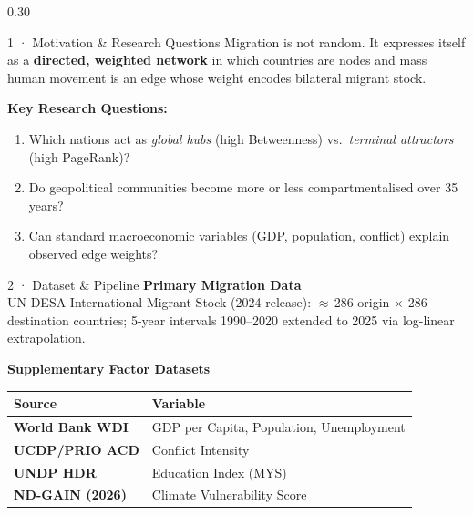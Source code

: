 \documentclass[final]{beamer}
\begin{document}
\begin{frame}[t,fragile]

\hspace{1.5cm}
\begin{columns}[T]

\begin{column}{0.30\textwidth}

  \begin{block}{1 · Motivation \& Research Questions}
    Migration is not random. It expresses itself as a
    \textbf{directed, weighted network} in which countries are nodes
    and mass human movement is an edge whose weight encodes
    bilateral migrant stock.

    \vspace{0.6em}
    \textbf{Key Research Questions:}
    \begin{enumerate}
      \item Which nations act as \emph{global hubs}
            (high Betweenness) vs.\ \emph{terminal attractors}
            (high PageRank)?
      \item Do geopolitical communities become more or
            less compartmentalised over 35 years?
      \item Can standard macroeconomic variables (GDP,
            population, conflict) explain observed edge weights?
    \end{enumerate}
  \end{block}

  \begin{block}{2 · Dataset \& Pipeline}
    \textbf{Primary Migration Data}\\
    UN DESA International Migrant Stock (2024 release):
    $\approx$\,286 origin $\times$ 286 destination countries;
    5-year intervals 1990–2020 extended to 2025 via
    log-linear extrapolation.

    \vspace{0.7em}
    \textbf{Supplementary Factor Datasets}
    \begin{center}
    \small
    \renewcommand{\arraystretch}{1.3}
    \begin{tabular}{>{\bfseries}l l}
      \toprule
      Source & Variable \\
      \midrule
      World Bank WDI & GDP per Capita, Population,
                        Unemployment \\
      UCDP/PRIO ACD  & Conflict Intensity \\
      UNDP HDR       & Education Index (MYS) \\
      ND-GAIN (2026) & Climate Vulnerability Score \\
      \bottomrule
    \end{tabular}
    \end{center}


\end{block}
\end{column}
\end{columns}
\end{frame}
\end{document}
